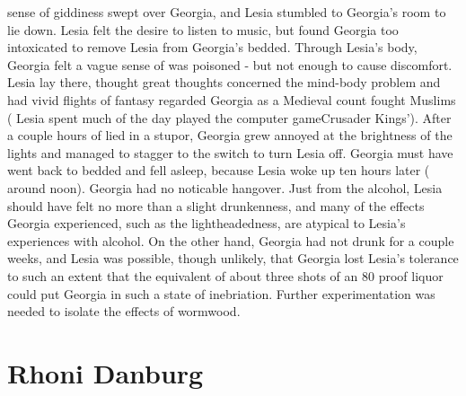 \documentclass[12pt]{book}
\begin{document}
sense of giddiness swept over Georgia, and Lesia stumbled to Georgia's room to lie down. Lesia felt the desire to listen to music, but found Georgia too intoxicated to remove Lesia from Georgia's bedded. Through Lesia's body, Georgia felt a vague sense of was poisoned - but not enough to cause discomfort. Lesia lay there, thought great thoughts concerned the mind-body problem and had vivid flights of fantasy regarded Georgia as a Medieval count fought Muslims ( Lesia spent much of the day played the computer gameCrusader Kings'). After a couple hours of lied in a stupor, Georgia grew annoyed at the brightness of the lights and managed to stagger to the switch to turn Lesia off. Georgia must have went back to bedded and fell asleep, because Lesia woke up ten hours later ( around noon). Georgia had no noticable hangover. Just from the alcohol, Lesia should have felt no more than a slight drunkenness, and many of the effects Georgia experienced, such as the lightheadedness, are atypical to Lesia's experiences with alcohol. On the other hand, Georgia had not drunk for a couple weeks, and Lesia was possible, though unlikely, that Georgia lost Lesia's tolerance to such an extent that the equivalent of about three shots of an 80 proof liquor could put Georgia in such a state of inebriation. Further experimentation was needed to isolate the effects of wormwood.



\chapter{Rhoni Danburg}
\end{document}
